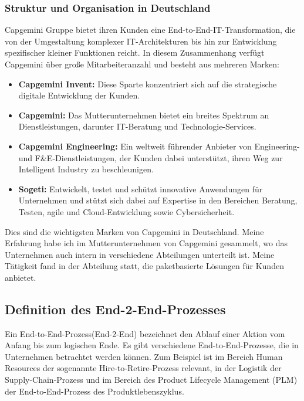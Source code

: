 \documentclass[a4paper, 12pt]{scrartcl}
\begin{document}
	\subsubsection{Struktur und Organisation in Deutschland}

Capgemini Gruppe bietet ihren Kunden eine End-to-End-IT-Transformation, die von der Umgestaltung komplexer IT-Architekturen bis hin zur Entwicklung spezifischer kleiner Funktionen reicht. In diesem Zusammenhang verfügt Capgemini über große Mitarbeiteranzahl und besteht aus mehreren Marken:
	\begin{itemize}
		\item \textbf{Capgemini Invent\cite{Capgemini_invent}:} Diese Sparte konzentriert sich auf die strategische digitale Entwicklung der Kunden.
		\item \textbf{Capgemini\cite{Capgemini}:} Das Mutterunternehmen bietet ein breites Spektrum an Dienstleistungen, darunter IT-Beratung und Technologie-Services.
		\item \textbf{Capgemini Engineering\cite{Capgemini_eng}:} Ein weltweit führender Anbieter von Engineering- und F\&E-Dienstleistungen, der Kunden dabei unterstützt, ihren Weg zur Intelligent Industry zu beschleunigen.
		\item \textbf{Sogeti\cite{Sogeti}:} Entwickelt, testet und schützt innovative Anwendungen für Unternehmen und stützt sich dabei auf Expertise in den Bereichen Beratung, Testen, agile und Cloud-Entwicklung sowie Cybersicherheit.
	\end{itemize}
Dies sind die wichtigsten Marken von Capgemini in Deutschland. Meine Erfahrung habe ich im Mutterunternehmen von Capgemini gesammelt, wo das Unternehmen auch intern in verschiedene Abteilungen unterteilt ist. Meine Tätigkeit fand in der Abteilung statt, die paketbasierte Lösungen %
  für Kunden anbietet.


	\subsection{Definition des End-2-End-Prozesses}
Ein End-to-End-Prozess(End-2-End) bezeichnet den Ablauf einer Aktion vom Anfang bis zum logischen Ende. Es gibt verschiedene End-to-End-Prozesse, die in Unternehmen betrachtet werden können. Zum Beispiel ist im Bereich Human Resources der sogenannte Hire-to-Retire-Prozess relevant, in der Logistik der Supply-Chain-Prozess und im Bereich des Product Lifecycle Management (PLM) der End-to-End-Prozess des Produktlebenszyklus.
\end{document}
